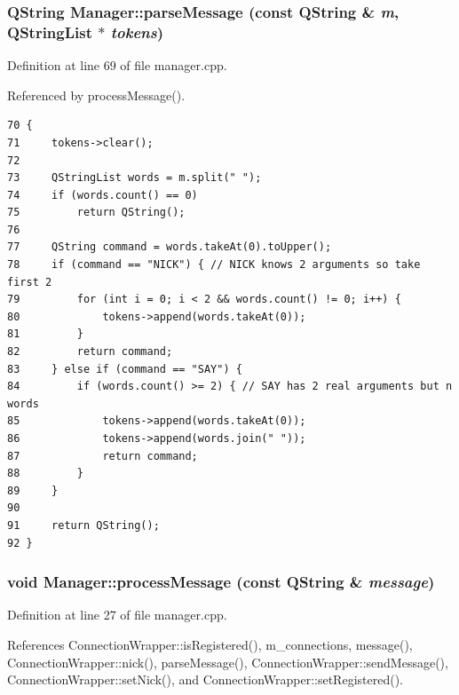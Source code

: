 \subsubsection{\setlength{\rightskip}{0pt plus 5cm}QString Manager::parseMessage (const QString \& {\em m}, QStringList $\ast$ {\em tokens})\hspace{0.3cm}{\tt  [private]}}\label{classManager_2650eab19167d3fa4a114d614c84d759}




Definition at line 69 of file manager.cpp.

Referenced by processMessage().

\begin{Code}\begin{verbatim}70 {
71     tokens->clear();
72 
73     QStringList words = m.split(" ");
74     if (words.count() == 0)
75         return QString();
76 
77     QString command = words.takeAt(0).toUpper();
78     if (command == "NICK") { // NICK knows 2 arguments so take first 2
79         for (int i = 0; i < 2 && words.count() != 0; i++) {
80             tokens->append(words.takeAt(0));
81         }
82         return command;
83     } else if (command == "SAY") {
84         if (words.count() >= 2) { // SAY has 2 real arguments but n words
85             tokens->append(words.takeAt(0));
86             tokens->append(words.join(" "));
87             return command;
88         }
89     }
90 
91     return QString();
92 }
\end{verbatim}
\end{Code}


\subsubsection{\setlength{\rightskip}{0pt plus 5cm}void Manager::processMessage (const QString \& {\em message})\hspace{0.3cm}{\tt  [private, slot]}}\label{classManager_6c73fe4165b0bba176d9177812d9407a}




Definition at line 27 of file manager.cpp.

References ConnectionWrapper::isRegistered(), m\_\-connections, message(), ConnectionWrapper::nick(), parseMessage(), ConnectionWrapper::sendMessage(), ConnectionWrapper::setNick(), and ConnectionWrapper::setRegistered().


